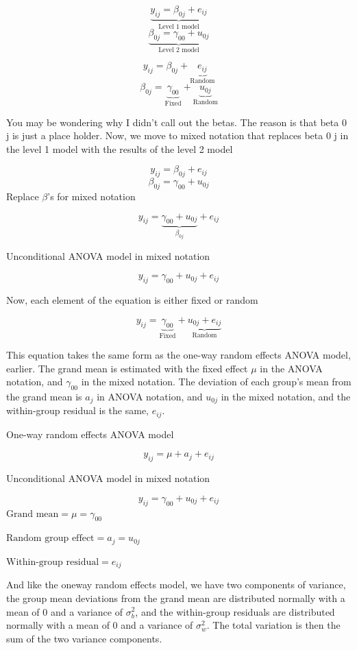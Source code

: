 \[
\underbrace{y_{ij} = \beta_{0j}+e_{ij}}_{\text{Level 1 model}}
\]
\[
\underbrace{\beta_{0j} = \gamma_{00}+u_{0j}}_{\text{Level 2 model}}
\]

\[
y_{ij} = \beta_{0j}+\underbrace{e_{ij}}_{\text{Random}}
\]
\[
\beta_{0j} = \underbrace{\gamma_{00}}_{\text{Fixed}}+\underbrace{u_{0j}}_{\text{Random}}
\]

You may be wondering why I didn't call out the betas. The reason is that beta 0 j is just a place holder. Now, we move to mixed notation that replaces beta 0 j in the level 1 model with the results of the level 2 model

\[
y_{ij} = \beta_{0j}+e_{ij}
\]
\[
\beta_{0j} = \gamma_{00}+u_{0j}
\]
Replace $\beta$'s for mixed notation

\[
y_{ij} = \underbrace{\gamma_{00}+u_{0j}}_{\beta_{0j}}+e_{ij}
\]

Unconditional ANOVA model in mixed notation

\[
y_{ij} = \gamma_{00}+u_{0j}+e_{ij}
\]

Now, each element of the equation is either fixed or random

\[
y_{ij} = \underbrace{\gamma_{00}}_{\text{Fixed}}+\underbrace{u_{0j}+e_{ij}}_{\text{Random}}
\]

This equation takes the same form as the one-way random effects ANOVA model, earlier. The grand mean is estimated with the fixed effect $\mu$ in the ANOVA notation, and $\gamma_{00}$ in the mixed notation. The deviation of each group's mean from the grand mean is $a_j$ in ANOVA notation, and $u_{0j}$ in the mixed notation, and the within-group residual is the same, $e_{ij}$.

One-way random effects ANOVA model

\[
y_{ij} = \mu + a_j+e_{ij}
\]

Unconditional ANOVA model in mixed notation

\[
y_{ij} = \gamma_{00}+u_{0j}+e_{ij}
\]
$\mbox{Grand mean} = \mu = \gamma_{00}$

$\mbox{Random group effect} = a_j = u_{0j} $

$\mbox{Within-group residual} = e_{ij}$

And like the oneway random effects model, we have two components of variance, the group mean deviations from the grand mean are distributed normally with a mean of 0 and a variance of $\sigma^2_b$, and the within-group residuals are distributed normally with a mean of 0 and a variance of $\sigma^2_w$. The total variation is then the sum of the two variance components.

